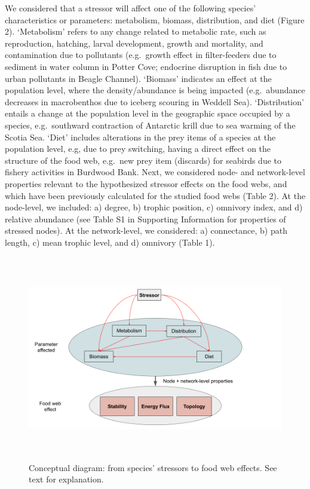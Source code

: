 \documentclass[
]{article}
\begin{document}
We considered that a stressor will affect one of the following species'
characteristics or parameters: metabolism, biomass, distribution, and
diet (Figure 2). `Metabolism' refers to any change related to metabolic
rate, such as reproduction, hatching, larval development, growth and
mortality, and contamination due to pollutants (e.g.~growth effect in
filter-feeders due to sediment in water column in Potter Cove; endocrine
disruption in fish due to urban pollutants in Beagle Channel). `Biomass'
indicates an effect at the population level, where the density/abundance
is being impacted (e.g.~abundance decreases in macrobenthos due to
iceberg scouring in Weddell Sea). `Distribution' entails a change at the
population level in the geographic space occupied by a species,
e.g.~southward contraction of Antarctic krill due to sea warming of the
Scotia Sea. `Diet' includes alterations in the prey items of a species
at the population level, e.g, due to prey switching, having a direct
effect on the structure of the food web, e.g.~new prey item (discards)
for seabirds due to fishery activities in Burdwood Bank. Next, we
considered node- and network-level properties relevant to the
hypothesized stressor effects on the food webs, and which have been
previously calculated for the studied food webs (Table 2). At the
node-level, we included: a) degree, b) trophic position, c) omnivory
index, and d) relative abundance (see Table S1 in Supporting Information
for properties of stressed nodes). At the network-level, we considered:
a) connectance, b) path length, c) mean trophic level, and d) omnivory
(Table 1).

\begin{figure}
\centering
\includegraphics[width=6.27in,height=3.528in]{Figures/Figure2_StressorDiagram.png}
\caption{Conceptual diagram: from species' stressors to food web
effects. See text for explanation.}
\end{figure}
\end{document}
